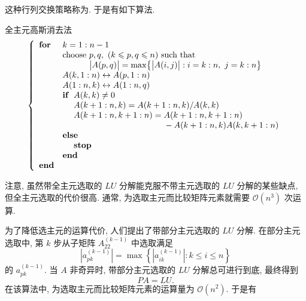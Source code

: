 这种行列交换策略称为. 于是有如下算法.

\begin{algorithm}{全主元高斯消去法}
  \label{alg:2-2}
\[
  \left\{
  \begin{array}{ll}
    \textbf{for} & k=1:n-1\\
    & \text{choose } p,q,\ (k\leqslant p,q\leqslant n)\ \text{such that}\\
    & \hphantom{\text{choose }}\bigl|A(p,q)\bigr|=\max\bigl\{\bigl|A(i,j)\bigr|:i=k:n,\ j=k:n\bigr\}\\
    & A(k,1:n)\leftrightarrow A(p,1:n)\\
    & A(1:n,k)\leftrightarrow A(1:n,q)\\
    & \textbf{if}\ \ A(k,k)\neq0\\
    & \hphantom{\textbf{if}\ \ }A(k+1:n,k)=A(k+1:n,k)/A(k,k)\\
    & \hphantom{\textbf{if}\ \ }A(k+1:n,k+1:n)=A(k+1:n,k+1:n)\\
    & \hphantom{\textbf{if}\ \ A(k+1:n,k+1:n)={}}-A(k+1:n,k)A(k,k+1:n)\\
    & \textbf{else}\\
    & \hphantom{\textbf{if}\ \ }\textbf{stop}\\
    & \textbf{end}\\
    \textbf{end}
  \end{array}
  \right.
\]
\end{algorithm}

注意, 虽然带全主元选取的 $LU$ 分解能克服不带主元选取的 $LU$ 分解的某些缺点, 但全主元选取的代价很高. 通常, 为选取主元而比较矩阵元素就需要 $\mathcal{O}(n^3)$ 次运算.

为了降低选主元的运算代价, 人们提出了带部分主元选取的 $LU$ 分解. 在部分主元选取中, 第 $k$ 步从子矩阵 $A_{22}^{(k-1)}$ 中选取满足
\[
  \left|a_{pk}^{(k-1)}\right|=\max\left\{\left|a_{ik}^{(k-1)}\right|:k\leqslant i\leqslant n\right\}
\]
的 $a_{pk}^{(k-1)}$. 当 $A$ 非奇异时, 带部分主元选取的 $LU$ 分解总可进行到底, 最终得到
\[
  PA=LU.
\]
在该算法中, 为选取主元而比较矩阵元素的运算量为 $\mathcal{O}(n^2)$. 于是有


